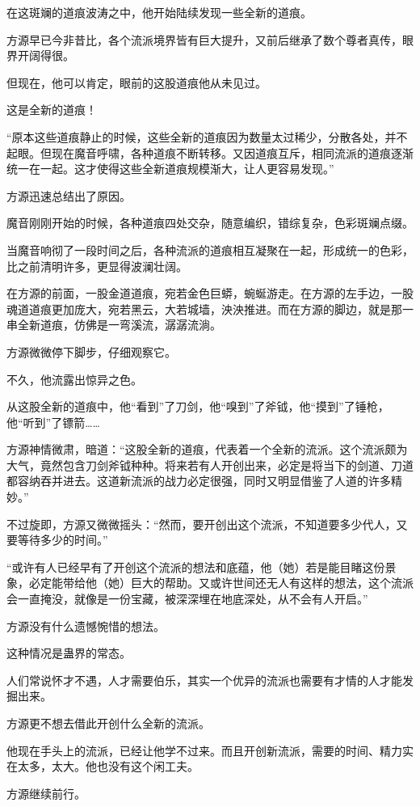 \begin{this_body}
在这斑斓的道痕波涛之中，他开始陆续发现一些全新的道痕。

方源早已今非昔比，各个流派境界皆有巨大提升，又前后继承了数个尊者真传，眼界开阔得很。

但现在，他可以肯定，眼前的这股道痕他从未见过。

这是全新的道痕！

“原本这些道痕静止的时候，这些全新的道痕因为数量太过稀少，分散各处，并不起眼。但现在魔音呼啸，各种道痕不断转移。又因道痕互斥，相同流派的道痕逐渐统一在一起。这才使得这些全新道痕规模渐大，让人更容易发现。”

方源迅速总结出了原因。

魔音刚刚开始的时候，各种道痕四处交杂，随意编织，错综复杂，色彩斑斓点缀。

当魔音响彻了一段时间之后，各种流派的道痕相互凝聚在一起，形成统一的色彩，比之前清明许多，更显得波澜壮阔。

在方源的前面，一股金道道痕，宛若金色巨蟒，蜿蜒游走。在方源的左手边，一股魂道道痕更加庞大，宛若黑云，大若城墙，泱泱推进。而在方源的脚边，就是那一串全新道痕，仿佛是一弯溪流，潺潺流淌。

方源微微停下脚步，仔细观察它。

不久，他流露出惊异之色。

从这股全新的道痕中，他“看到”了刀剑，他“嗅到”了斧钺，他“摸到”了锤枪，他“听到”了镖箭……

方源神情微肃，暗道：“这股全新的道痕，代表着一个全新的流派。这个流派颇为大气，竟然包含刀剑斧钺种种。将来若有人开创出来，必定是将当下的剑道、刀道都容纳吞并进去。这道新流派的战力必定很强，同时又明显借鉴了人道的许多精妙。”

不过旋即，方源又微微摇头：“然而，要开创出这个流派，不知道要多少代人，又要等待多少的时间。”

“或许有人已经早有了开创这个流派的想法和底蕴，他（她）若是能目睹这份景象，必定能带给他（她）巨大的帮助。又或许世间还无人有这样的想法，这个流派会一直掩没，就像是一份宝藏，被深深埋在地底深处，从不会有人开启。”

方源没有什么遗憾惋惜的想法。

这种情况是蛊界的常态。

人们常说怀才不遇，人才需要伯乐，其实一个优异的流派也需要有才情的人才能发掘出来。

方源更不想去借此开创什么全新的流派。

他现在手头上的流派，已经让他学不过来。而且开创新流派，需要的时间、精力实在太多，太大。他也没有这个闲工夫。

方源继续前行。


\end{this_body}
